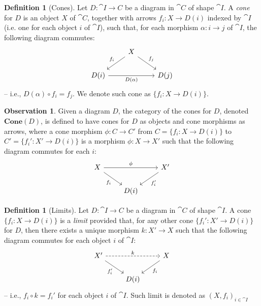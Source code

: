 \documentclass[a4paper, twoside,openright]{report}
\theoremstyle{plain}
\theoremstyle{definition}
\newtheorem{definition}[theorem]{Definition}
\newtheorem{obs}[theorem]{Observation}
\begin{document}
\begin{definition}[Cones]
    Let $D:\cat {I \rightarrow C}$ be a diagram in $\cat C$ of shape $\cat I$. A \emph{cone} for $D$ is an object $X$ of $\cat C$, together with arrows $f_i : X \rightarrow D(i)$ indexed by $\cat I$ (i.e. one for each object $i$ of $\cat I$), such that, for each morphism $\alpha: i \rightarrow j$ of $\cat I$, the following diagram commutes:
    \[
        \begin{tikzcd}
            & X \arrow[dl, "{f_i}"swap] \arrow[dr, "{f_j}"] & \\
            D(i) \arrow[rr, "{D(\alpha)}" swap] & & D(j)
        \end{tikzcd}
    \]
    -- i.e., $D(\alpha) \circ f_i = f_j$.
    We denote such cone as $\{f_i: X \rightarrow D(i)\}$.

\end{definition}

\begin{obs}\label{obs:category_of_cones}
    Given a diagram $D$, the category of the cones for $D$, denoted $\textbf{Cone}(D)$, is defined to have cones for $D$ as objects and cone morphisms as arrows, where a cone morphism $\phi: C \rightarrow C'$ from $C = \{f_i: X \rightarrow D(i)\}$ to $C' = \{f_i':X' \rightarrow D(i)\}$ is a morphism $\phi: X \rightarrow X'$ such that the following diagram commutes for each $i$:
    \[
        \begin{tikzcd}
            X \arrow[rr, "{\phi}"] \arrow[dr, "{f_i}" swap] & & X' \arrow[dl, "{f_i'}"] \\
            & D(i) &
        \end{tikzcd}
    \]
\end{obs}

\begin{definition}[Limits]\label{def:limit}
    Let $D:\cat {I \rightarrow C}$ be a diagram in $\cat C$ of shape $\cat I$. A cone $\{f_i: X \rightarrow D(i)\}$ is a \emph{limit} provided that, for any other cone $\{f_{i}': X' \rightarrow D(i)\}$ for $D$, then there exists a unique morphism $k: X' \rightarrow X$ such that the following diagram commutes for each object $i$ of $\cat I$:
    \[
        \begin{tikzcd}
            X' \arrow[rr, dashed, "k"] \arrow[dr, "{f_i'}" swap] & & X \arrow[dl, "{f_i}"] \\
            & D(i) &
        \end{tikzcd}
    \]
    -- i.e., $f_i \circ k = f_i'$ for each object $i$ of $\cat I$. Such limit is denoted as $(X, f_i)_{i \in \cat I}$
\end{definition}
\end{document}
